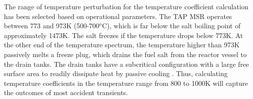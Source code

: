 The range of temperature perturbation for the temperature coefficient  
calculation has been selected based on operational parameters. The \gls{TAP} 
\gls{MSR} operates between 773 and 973K (500-700$^o$C), which is far below the 
salt boiling point of approximately 1473K. The salt freezes if the temperature 
drops below 773K. At the other end of the temperature spectrum, the 
temperature higher than 973K passively melts a freeze plug, which drains the 
fuel salt from the reactor vessel to the drain tanks. The drain tanks have a 
subcritical configuration with a large free surface area to readily dissipate 
heat by passive cooling \cite{transatomic_power_corporation_technical_2016}. 
Thus, calculating temperature coefficients in the temperature range from 800 
to 1000K will capture  the outcomes of most
accident transients.


